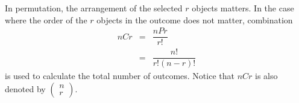 In permutation, the arrangement of the selected $r$ objects matters. In the case where the order of the $r$ objects in the outcome does not matter, combination
\begin{eqnarray}
  nCr &=& \dfrac{nPr}{r!} \nonumber \\ 
  &=& \dfrac{n!}{r!(n-r)!} \nonumber
\end{eqnarray}
is used to calculate the total number of outcomes. Notice that $nCr$ is also denoted by $\left(\begin{array}{c}
                                                                                           n \\
                                                                                           r
                                                                                         \end{array}\right)$.
